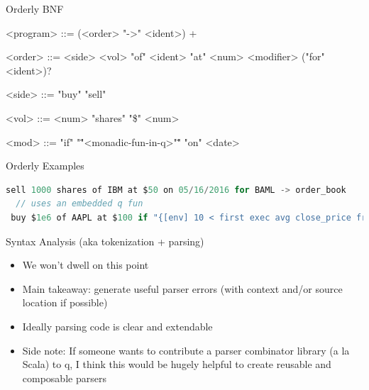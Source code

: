 \documentclass{beamer}
\begin{document}
\begin{frame}[fragile]{Orderly BNF}
	\begin{grammar}
		<program> ::= (<order> "->" <ident>) +

		<order>  ::= <side> <vol> "of" <ident> "at" <num> <modifier> ("for" <ident>)?

		<side> ::= "buy"  \alt "sell"

		<vol> ::= <num> "shares" \alt "\$" <num>

		<mod> ::= "if" "\""<monadic-fun-in-q>"\"" \alt "on" <date>
	\end{grammar}
\end{frame}

\begin{frame}[fragile]{Orderly Examples}
\begin{lstlisting}[language=C]
 sell 1000 shares of IBM at $50 on 05/16/2016 for BAML -> order_book
  // uses an embedded q fun
 buy $1e6 of AAPL at $100 if "{[env] 10 < first exec avg close_price from env where sector=Tech} " -> order_book
\end{lstlisting}
\end{frame}




\begin{frame}{Syntax Analysis (aka tokenization + parsing) }
\begin{itemize}
	\item We won't dwell on this point
	\item Main takeaway: generate useful parser errors (with context and/or source location if possible)
	\item Ideally parsing code is clear and extendable
	\item Side note: If someone wants to contribute a parser combinator library (a la Scala) to q, I think this would be hugely helpful to create reusable and composable parsers
\end{itemize}
\end{frame}
\end{document}
